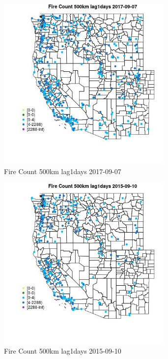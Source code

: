 \begin{figure} 
\centering  
\includegraphics[width=0.77\textwidth]{Code_Outputs/Report_ML_input_PM25_Step4_part_e_de_duplicated_aves_compiled_2019-05-21wNAs_MapObsFire_Count_500km_lag1days2017-09-07.jpg} 
\caption{\label{fig:Report_ML_input_PM25_Step4_part_e_de_duplicated_aves_compiled_2019-05-21wNAsMapObsFire_Count_500km_lag1days2017-09-07}Fire Count 500km lag1days 2017-09-07} 
\end{figure} 
 

\clearpage 

\begin{figure} 
\centering  
\includegraphics[width=0.77\textwidth]{Code_Outputs/Report_ML_input_PM25_Step4_part_e_de_duplicated_aves_compiled_2019-05-21wNAs_MapObsFire_Count_500km_lag1days2015-09-10.jpg} 
\caption{\label{fig:Report_ML_input_PM25_Step4_part_e_de_duplicated_aves_compiled_2019-05-21wNAsMapObsFire_Count_500km_lag1days2015-09-10}Fire Count 500km lag1days 2015-09-10} 
\end{figure} 
 

